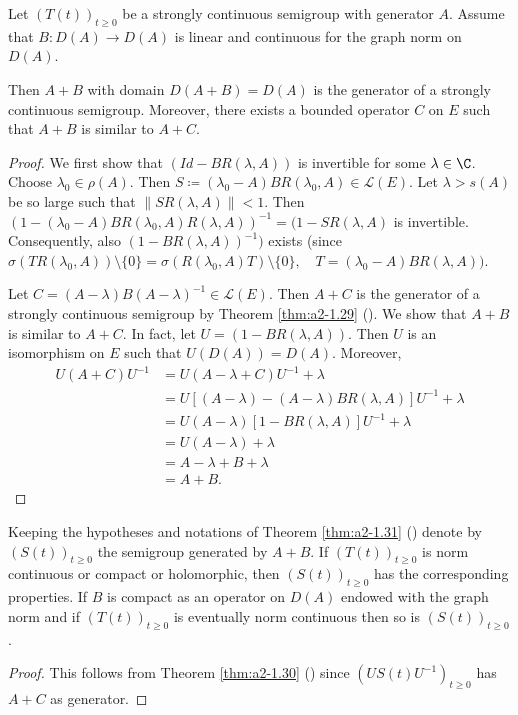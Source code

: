 \begin{theorem}\label{thm:a2-1.31}
Let $(T(t))_{t \geq 0}$ be a strongly continuous semigroup with generator $A$.
Assume that $B \colon D(A) \to D(A)$ is linear and continuous for the graph norm on $D(A)$.

Then $A + B$ with domain $D(A + B) = D(A)$ is the generator of a strongly continuous semigroup.
Moreover, there exists a bounded operator $C$ on $E$ such that $A + B$ is similar to $A + C$.
\end{theorem}
\begin{proof}
We first show that $(Id - BR(\lambda,A))$ is invertible for some $\lambda \in \C$.
Choose $\lambda_{0} \in \rho(A)$.
Then $S \coloneqq (\lambda_{0}-A)BR(\lambda_{0},A) \in \mathcal{L}(E)$.
Let $\lambda > s(A)$ be so large such that $\|SR(\lambda,A)\| < 1$.
Then $(1 - (\lambda_{0} - A)BR(\lambda_{0},A)R(\lambda,A))^{-1} = (1 - SR(\lambda,A)$ is invertible.
Consequently, also $(1 -BR(\lambda,A))^{-1})$ exists
(since $\sigma(TR(\lambda_{0},A)) \setminus \{0\} 
= \sigma(R(\lambda_{0},A)T) \setminus \{0\}, \quad T = (\lambda_{0}-A)BR(\lambda,A) )$.

Let $C = (A-\lambda)B(A-\lambda)^{-1} \in \mathcal{L}(E)$.
Then $A + C$ is the generator of a strongly continuous semigroup by Theorem \ref{thm:a2-1.29} ().
We show that $A + B$ is similar to $A + C$.
In fact, let $U = (1 - BR(\lambda,A))$.
Then $U$ is an isomorphism on $E$ such that $U(D(A)) = D(A)$.
Moreover,
\begin{align*}		
U(A+C)U^{-1} &= U(A - \lambda+C)U^{-1} + \lambda \\
&= U[(A - \lambda) - (A-\lambda)BR(\lambda,A)]U^{-1} + \lambda \\
&= U(A - \lambda)[1 - BR(\lambda,A)]U^{-1} + \lambda \\
&= U(A - \lambda) + \lambda \\
&= A - \lambda + B + \lambda \\
&= A + B.	
\end{align*}
\end{proof}
\begin{corollary}\label{cor:a2-1.32}
Keeping the hypotheses and notations of Theorem \ref{thm:a2-1.31} () denote by $(S(t))_{t\geq 0}$ the semigroup generated by $A+B$.
If $(T(t))_{t\geq 0}$ is norm continuous or compact or holomorphic, then $(S(t))_{t\geq 0}$ has the corresponding properties.
If $B$ is compact as an operator on $D(A)$ endowed with the graph norm and if $(T(t))_{t\geq 0}$ is eventually norm continuous then so is $(S(t))_{t\geq 0}$.
\end{corollary}
\begin{proof}
This follows from Theorem \ref{thm:a2-1.30} () since 
$(US(t)U^{-1})_{t\geq 0}$ has $A+C$ as generator.
\end{proof}
